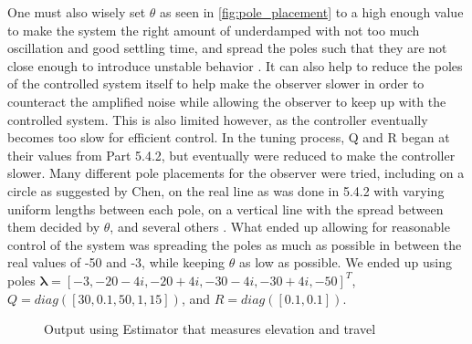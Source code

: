 One must also wisely set $\theta$ as seen in \cref{fig:pole_placement}
to a high enough value to make the system the right amount of
underdamped with not too much oscillation and good settling time, and
spread the poles such that they are not close enough to introduce
unstable behavior \cite[p.290]{chen14}. It can also help to reduce the
poles of the controlled system itself to help make the observer slower
in order to counteract the amplified noise while allowing the observer
to keep up with the controlled system. This is also limited however,
as the controller eventually becomes too slow for efficient control.
In the tuning process, Q and R began at their values from Part 5.4.2,
but eventually were reduced to make the controller slower. Many
different pole placements for the observer were tried, including on a
circle as suggested by Chen, on the real line as was done in 5.4.2
with varying uniform lengths between each pole, on a vertical line
with the spread between them decided by $\theta$, and several others
\cite[p.290]{chen14}.
What ended up allowing for reasonable control of the system was
spreading the poles as much as possible in between the real values of
-50 and -3, while keeping $\theta$ as low as possible.  We ended up
using poles $\bm{\lambda} = [-3, -20-4i, -20+4i, -30-4i, -30+4i,
-50]^T$, $Q = diag([30, 0.1, 50, 1, 15])$, and $R = diag([0.1,
0.1])$.

\begin{figure}
  \caption{Output using Estimator that measures elevation and travel}
  \label{fig:Estimator4_3}
\end{figure}
\restoregeometry
